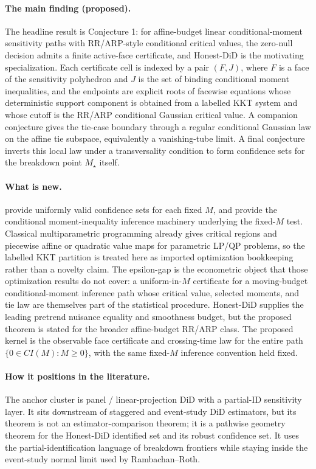 \documentclass[11pt]{article}
\theoremstyle{definition}
\theoremstyle{plain}
\theoremstyle{remark}
\begin{document}
\paragraph{The main finding (proposed).}
The headline result is Conjecture 1: for affine-budget linear
conditional-moment sensitivity paths with RR/ARP-style conditional critical
values, the zero-null decision admits a finite active-face certificate, and
Honest-DiD is the motivating specialization.  Each certificate cell is indexed
by a pair \((F,J)\), where \(F\) is a face of the sensitivity polyhedron and
\(J\) is the set of binding conditional moment inequalities, and the endpoints
are explicit roots of facewise equations whose deterministic support component
is obtained from a labelled KKT system and whose cutoff is the RR/ARP
conditional Gaussian critical value.  A companion conjecture gives the
tie-case boundary through a regular conditional Gaussian law on the affine tie
subspace, equivalently a vanishing-tube limit.  A final conjecture inverts this
local law under a transversality condition to form confidence sets for the
breakdown point \(M_\star\) itself.

\paragraph{What is new.}
\citet{RambachanRoth2023} provide uniformly valid confidence sets for each
fixed \(M\), and \citet{AndrewsRothPakes2023} provide the conditional
moment-inequality inference machinery underlying the fixed-\(M\) test.
Classical multiparametric programming already gives critical regions and
piecewise affine or quadratic value maps for parametric LP/QP problems, so
the labelled KKT partition is treated here as imported optimization
bookkeeping rather than a novelty claim.  The epsilon-gap is the econometric
object that those optimization results do not cover: a uniform-in-\(M\)
certificate for a moving-budget conditional-moment inference path whose
critical value, selected moments, and tie law are themselves part of the
statistical procedure.  Honest-DiD supplies the leading pretrend nuisance
equality and smoothness budget, but the proposed theorem is stated for the
broader affine-budget RR/ARP class.  The proposed kernel is the observable
face certificate and crossing-time law for the entire path
\(\{0\in CI(M):M\ge 0\}\), with the same fixed-\(M\) inference convention held
fixed.

\paragraph{How it positions in the literature.}
The anchor cluster is panel / linear-projection DiD with a partial-ID
sensitivity layer.  It sits downstream of staggered and event-study DiD
estimators, but its theorem is not an estimator-comparison theorem; it is a
pathwise geometry theorem for the Honest-DiD identified set and its robust
confidence set.  It uses the partial-identification language of breakdown
frontiers while staying inside the event-study normal limit used by
Rambachan--Roth.
\end{document}
